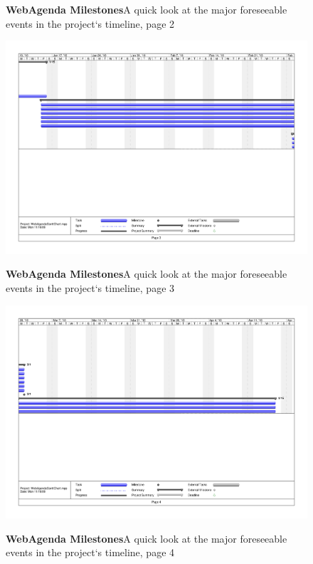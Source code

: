 \documentclass[letterpaper,12pt]{report}
\begin{document}
\begin{landscape}
\begin{figure}[htp]
 \caption{\small
\textbf{WebAgenda Milestones}\newline \space A quick look at the major foreseeable events in the project`s timeline, page 2}
\label{fig:gantt2}
\end{figure}
\newpage
\begin{figure}[htp]
  \includegraphics[scale=0.7]{externals/gantt3.pdf}
 \caption{\small
\textbf{WebAgenda Milestones}\newline \space A quick look at the major foreseeable events in the project`s timeline, page 3}
\label{fig:gantt3}
\end{figure}
\newpage
\begin{figure}[htp]
  \includegraphics[scale=0.7]{externals/gantt4.pdf}
 \caption{\small
\textbf{WebAgenda Milestones}\newline \space A quick look at the major foreseeable events in the project`s timeline, page 4}
\label{fig:gantt4}
\end{figure}
\end{landscape}
\end{document}
